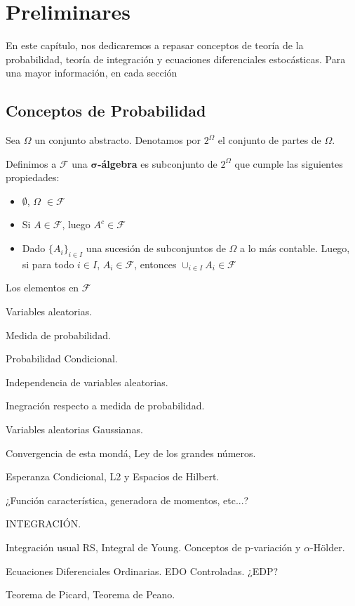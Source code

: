 
\chapter{Preliminares}


En este capítulo, nos dedicaremos a repasar conceptos de teoría de la probabilidad, teoría de integración y ecuaciones diferenciales estocásticas. Para una mayor información, en cada sección






\section{Conceptos de Probabilidad}

Sea $\Omega$ un conjunto abstracto. Denotamos por $2^{\Omega}$ el conjunto de partes de $\Omega$.

\begin{boxDef}
Definimos a $\mathcal{F}$ una $\mathbf{\sigma}$\textbf{-álgebra} es subconjunto de $2^{\Omega}$ que cumple las siguientes propiedades:

	\begin{itemize}
		\item $\emptyset$, $\Omega$ $\in \mathcal{F}$
		\item Si $A \in \mathcal{F}$, luego $A^{c} \in \mathcal{F}$
		\item Dado $\{ A_i \}_{i \in I}$ una sucesión de subconjuntos de $\Omega$ a lo más contable. Luego, si para todo $i \in I$, $A_i \in \mathcal{F}$, entonces $\cup_{i \in I} A_i \in \mathcal{F}$ 
	\end{itemize}

\end{boxDef}

Los elementos en $\mathcal{F}$



Variables aleatorias.

Medida de probabilidad.

Probabilidad Condicional.

Independencia de variables aleatorias.

Inegración respecto a medida de probabilidad.

Variables aleatorias Gaussianas.

Convergencia de esta mondá, Ley de los grandes números.

Esperanza Condicional, L2 y Espacios de Hilbert.

¿Función característica, generadora de momentos, etc...?


INTEGRACIÓN.

Integración usual RS, Integral de Young. Conceptos de p-variación y $\alpha$-Hölder.

Ecuaciones Diferenciales Ordinarias. EDO Controladas. ¿EDP?

Teorema de Picard, Teorema de Peano.